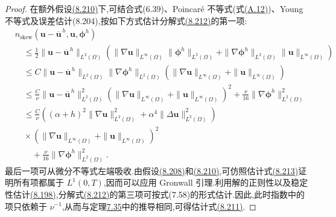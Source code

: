\begin{theorem}
\begin{proof}
在额外假设\hyperref[eq:leray-alpha-error-regularity-Linfty]{(8.210)}下,可结合式(6.39)、Poincaré 不等式(式\hyperref[eq:appendix-a-12]{(A.12)})、Young 不等式及误差估计(8.204),按如下方式估计分解式\hyperref[eq:leray-alpha-fem-convection-decomposition]{(8.212)}的第一项:
\begin{equation}\label{eq:leray-alpha-fem-error-strong-convection-bound}
\begin{aligned}
 &n_{\mathrm{skew}}(\bm{u}-\overline{\bm{u}}^{\,h},
                    \bm{u},\symbf{\phi}^h)\\
 &\quad\le \frac12
  \|\bm{u}-\overline{\bm{u}}^{\,h}\|_{L^2(\Omega)}
  \left(
    \|\nabla\bm{u}\|_{L^\infty(\Omega)}
      \|\symbf{\phi}^h\|_{L^2(\Omega)}
   +\|\nabla\symbf{\phi}^h\|_{L^2(\Omega)}
      \|\bm{u}\|_{L^\infty(\Omega)}
  \right)\\
 &\quad\le C
  \|\bm{u}-\overline{\bm{u}}^{\,h}\|_{L^2(\Omega)}
  \|\nabla\symbf{\phi}^h\|_{L^2(\Omega)}
  \left(\|\nabla\bm{u}\|_{L^\infty(\Omega)}
       +\|\bm{u}\|_{L^\infty(\Omega)}\right)\\
 &\quad\le \frac{C}{\nu}
  \|\bm{u}-\overline{\bm{u}}^{\,h}\|_{L^2(\Omega)}^2
  \left(\|\nabla\bm{u}\|_{L^\infty(\Omega)}
       +\|\bm{u}\|_{L^\infty(\Omega)}\right)^2
  +\frac{\nu}{16}
   \|\nabla\symbf{\phi}^h\|_{L^2(\Omega)}^2\\
  &\quad\le\frac{C}{\nu}
  \left((\alpha+h)^2\|\nabla\bm{u}\|_{L^2(\Omega)}^2
       +\alpha^4\|\Delta\bm{u}\|_{L^2(\Omega)}^2\right)\\
  &\quad\times\left(\|\nabla\bm{u}\|_{L^\infty(\Omega)}
       +\|\bm{u}\|_{L^\infty(\Omega)}\right)^2\\
 &\qquad+\frac{\nu}{16}
   \|\nabla\symbf{\phi}^h\|_{L^2(\Omega)}^2.
\end{aligned}
\end{equation}
最后一项可从微分不等式左端吸收.由假设\hyperref[eq:leray-alpha-error-regularity-laplacian]{(8.208)}和\hyperref[eq:leray-alpha-error-regularity-Linfty]{(8.210)},可仿照估计式\hyperref[eq:leray-alpha-fem-error-Laplacian-integrability]{(8.213)}证明所有项都属于 $L^1(0,T)$,因而可以应用 Gronwall 引理.利用解的正则性以及稳定性估计\hyperref[eq:leray-alpha-discrete-filter-L2-stability]{(8.198)},分解式\hyperref[eq:leray-alpha-fem-convection-decomposition]{(8.212)}的第三项可按式(7.58)的形式估计.因此,此时指数中的项只依赖于 $\nu^{-1}$,从而与定理\hyperref[thm:time-dependent-fem-velocity-error]{7.35}中的推导相同,可得估计式\hyperref[eq:leray-alpha-fem-error-estimate-strong-regularity]{(8.211)}.
\end{proof}
\end{theorem}

